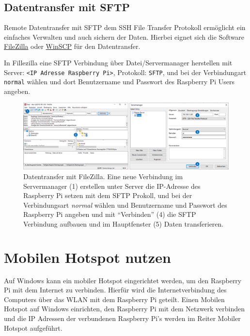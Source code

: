 \documentclass[
  11pt,
  a4paperpaper,
  oneside, openany  ,captions=tableheading
]{scrbook}
\theoremstyle{definition}
\theoremstyle{remark}
\begin{document}
\subsection{Datentransfer mit SFTP}\label{datentransfer-mit-sftp}

Remote Datentransfer mit SFTP dem SSH File Transfer
Protokoll ermöglicht ein
einfaches Verwalten und auch sichern der Daten. Hierbei eignet sich die
Software \href{https://filezilla-project.org/}{FileZilla} oder
\href{https://winscp.net/eng/docs/lang:de}{WinSCP} für den
Datentransfer.

In Fillezilla eine SFTP Verbindung über Datei/Servermanager herstellen
mit Server:
\texttt{\textless{}IP\ Adresse\ Raspberry\ Pi\textgreater{}}, Protokoll:
\texttt{SFTP}, und bei der Verbindungart \texttt{normal} wählen und dort
Benutzername und Passwort des Raspberry Pi Users angeben.

\begin{figure}[H]

{\centering \includegraphics{images/raspberry_pi_filezilla.png}

}

\caption{Datentransfer mit FileZilla. Eine neue Verbindung im
Servermanager (1) erstellen unter Server die IP-Adresse des Raspberry Pi
setzen mit dem SFTP Prokoll, und bei der Verbindungsart \emph{normal}
wählen und Benutzername und Passwort des Raspberry Pi angeben und mit
``Verbinden'' (4) die SFTP Verbindung aufbauen und im Hauptfenster (5)
Daten transferieren.}

\end{figure}%

\section{Mobilen Hotspot nutzen}\label{mobilen-hotspot-nutzen}

Auf Windows kann ein mobiler Hotspot eingerichtet werden, um den
Raspberry Pi mit dem Internet zu verbinden. Hierfür wird die
Internetverbindung des Computers über das WLAN mit dem Raspberry Pi
geteilt. Einen Mobilen Hotspot auf Windows einrichten, den Raspberry Pi
mit dem Netzwerk verbinden und die IP Adressen der verbundenen Raspberry
Pi's werden im Reiter Mobiler Hotspot aufgeführt.
\end{document}
